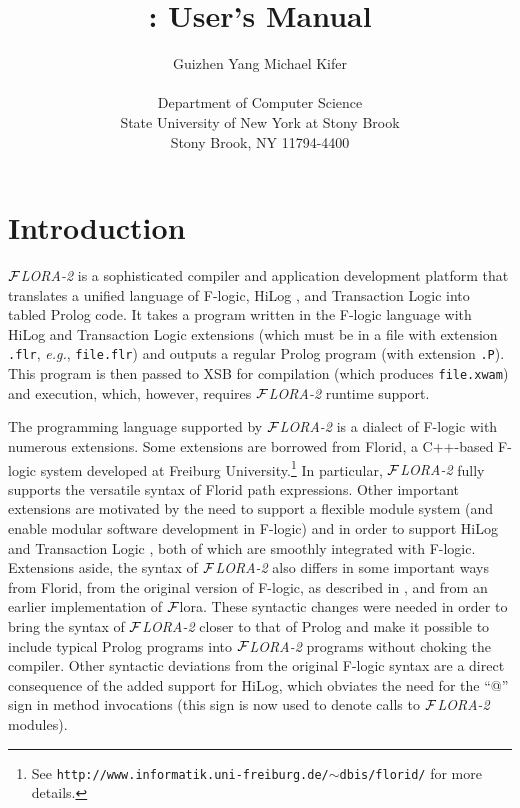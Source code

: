 \documentclass[11pt]{article}
\title{\FLORA: User's Manual}
\author{
  {Guizhen Yang
  \hspace{3cm}
  Michael Kifer}
  \\\\
  Department of Computer Science\\
  State University of New York at Stony Brook\\
  Stony Brook, NY 11794-4400
  }
\newcommand{\FLORA}{{\mbox{${\cal F}${\small\it LORA}\rm\emph{-2}}}\xspace}
\newcommand{\FLORAone}{{\mbox{${\cal F}${\sc lora}}}\xspace}
\newcommand{\FLORID}{{\mbox{\sc Florid}}\xspace}
\newcommand{\fl}{\mbox{F-logic}\xspace}
\newcommand{\ofile}{xwam}
\begin{document}
\maketitle
\thispagestyle{empty}

\newpage
{}
\setcounter{page}{1}

\tableofcontents

\newpage

\setcounter{page}{1}


\section{Introduction}

\FLORA is a sophisticated compiler and application development platform
that translates a unified language of \fl \cite{KLW95}, HiLog
\cite{hilog-jlp}, and Transaction Logic \cite{trans-tcs94} into tabled
Prolog code. It takes a program written in the \fl language with HiLog and
Transaction Logic extensions (which must be in a file with extension {\tt
  .flr}, {\it e.g.}, {\tt file.flr}) and outputs a regular Prolog program
(with extension {\tt .P}).  This program is then passed to XSB for
compilation (which produces {\tt file.\ofile}) and execution, which,
however, requires \FLORA runtime support.

The programming language
supported by \FLORA is a dialect of \fl with numerous extensions.  Some
extensions are borrowed from \FLORID, a C++-based \fl system developed at
Freiburg University.\footnote{
  See {\tt http://www.informatik.uni-freiburg.de/$\sim$dbis/florid/} for more
  details.
  }
In particular, \FLORA fully supports the versatile syntax of \FLORID path
expressions. Other important extensions are motivated by the need to
support a flexible module system (and enable modular software development
in \fl) and in order to support HiLog \cite{hilog-jlp} and Transaction
Logic \cite{trans-dbpl93,trans-iclp93,trans-tcs94}, both of which are
smoothly integrated with \fl. Extensions aside, the syntax of \FLORA also
differs in some important ways from \FLORID, from the original version of
\fl, as described in \cite{KLW95}, and from an earlier implementation
of \FLORAone. These syntactic changes were needed in order to bring the
syntax of \FLORA closer to that of Prolog and make it possible to include
typical Prolog programs into \FLORA programs without choking the compiler.
Other syntactic deviations from the original F-logic syntax are a direct
consequence of the added support for HiLog, which obviates the need for the
``@'' sign in method invocations (this sign is now used to denote calls to
\FLORA modules).
\end{document}
